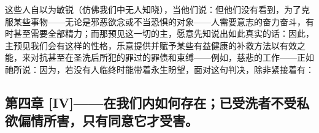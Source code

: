 这些人自以为敏锐（仿佛我们中无人知晓），当他们说：但他们没有看到，为了克服某些事物——无论是邪恶欲念或不当恐惧的对象——人需要意志的奋力奋斗，有时甚至需要全部精力；而那预见这一切的主，愿意先知说出如此真实的话：因此，主预见我们会有这样的性格，乐意提供并赋予某些有益健康的补救方法以有效之能，来对抗甚至在圣洗后所犯的罪过的罪债和束缚——例如，慈悲的工作——正如祂所说：因为，若没有人临终时能带着永生盼望，面对这句判决，除非紧接着有：\par


\subsection{第四章 [IV]——在我们内如何存在；已受洗者不受私欲偏情所害，只有同意它才受害。}

